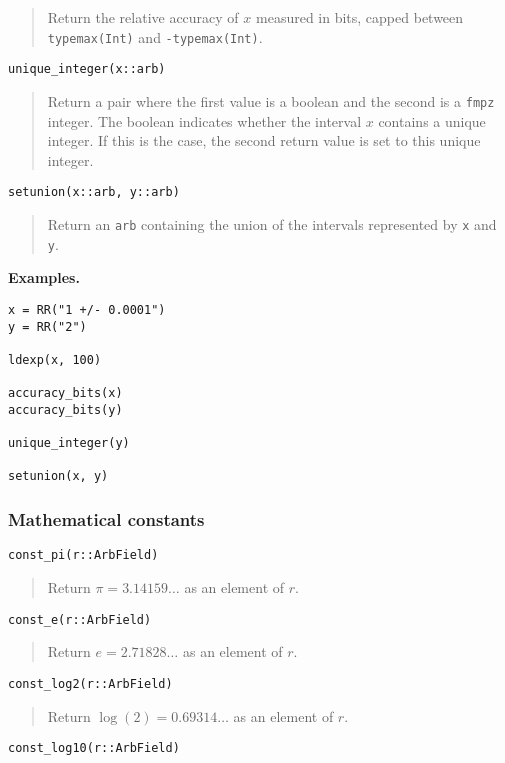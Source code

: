 \documentclass[a4paper,10pt]{article}
\newcommand{\code}{\lstinline}
\newcommand{\desc}[1]{\vspace{-3mm}\begin{quote}#1\end{quote}}
\begin{document}
{{\desc{Return the relative accuracy of $x$ measured in bits, capped
between \code{typemax(Int)} and \code{-typemax(Int)}.}

\begin{lstlisting}
unique_integer(x::arb)
\end{lstlisting}

\desc{Return a pair where the first value is a boolean and the second
is a \code{fmpz} integer. The boolean indicates whether the interval $x$
contains a unique integer. If this is the case, the second return
value is set to this unique integer.}

\begin{lstlisting}
setunion(x::arb, y::arb)
\end{lstlisting}

\desc{Return an \code{arb} containing the union of the intervals
represented by \code{x} and \code{y}.}

\textbf{Examples.}

\begin{lstlisting}
x = RR("1 +/- 0.0001")
y = RR("2")

ldexp(x, 100)

accuracy_bits(x)
accuracy_bits(y)

unique_integer(y)

setunion(x, y)
\end{lstlisting}

\subsubsection{Mathematical constants}

\begin{lstlisting}
const_pi(r::ArbField)
\end{lstlisting}

\desc{Return $\pi = 3.14159\ldots$ as an element of $r$.}

\begin{lstlisting}
const_e(r::ArbField)
\end{lstlisting}

\desc{Return $e = 2.71828\ldots$ as an element of $r$.}

\begin{lstlisting}
const_log2(r::ArbField)
\end{lstlisting}

\desc{Return $\log(2) = 0.69314\ldots$ as an element of $r$.}

\begin{lstlisting}
const_log10(r::ArbField)
\end{lstlisting}

}}
\end{document}
